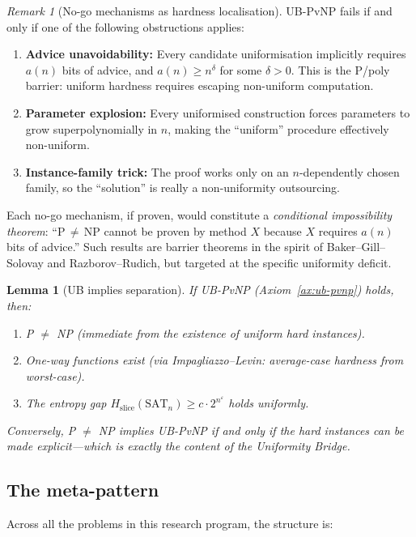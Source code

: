 \documentclass[aps,prd,twocolumn,superscriptaddress,nofootinbib]{revtex4-2}
\newtheorem{lemma}[theorem]{Lemma}
\theoremstyle{definition}
\theoremstyle{remark}
\newtheorem{remark}[theorem]{Remark}
\begin{document}
\begin{remark}[No-go mechanisms as hardness localisation]\label{rem:ub-nogo}
UB-PvNP fails if and only if one of the following obstructions applies:
\begin{enumerate}
\item \textbf{Advice unavoidability:} Every candidate uniformisation implicitly requires $a(n)$ bits of advice, and $a(n) \geq n^\delta$ for some $\delta > 0$. This is the P/poly barrier: uniform hardness requires escaping non-uniform computation.
\item \textbf{Parameter explosion:} Every uniformised construction forces parameters to grow superpolynomially in $n$, making the ``uniform'' procedure effectively non-uniform.
\item \textbf{Instance-family trick:} The proof works only on an $n$-dependently chosen family, so the ``solution'' is really a non-uniformity outsourcing.
\end{enumerate}
Each no-go mechanism, if proven, would constitute a \emph{conditional impossibility theorem}: ``P$\,\neq\,$NP cannot be proven by method $X$ because $X$ requires $a(n)$ bits of advice.'' Such results are barrier theorems in the spirit of Baker--Gill--Solovay and Razborov--Rudich, but targeted at the specific uniformity deficit.
\end{remark}

\begin{lemma}[UB implies separation]\label{lem:ub-separation}
If UB-PvNP (Axiom~\ref{ax:ub-pvnp}) holds, then:
\begin{enumerate}
\item[(a)] P $\neq$ NP (immediate from the existence of uniform hard instances).
\item[(b)] One-way functions exist (via Impagliazzo--Levin: average-case hardness from worst-case).
\item[(c)] The entropy gap $H_{\mathrm{slice}}(\mathrm{SAT}_n) \geq c \cdot 2^{n^\varepsilon}$ holds uniformly.
\end{enumerate}
Conversely, P $\neq$ NP implies UB-PvNP if and only if the hard instances can be made \emph{explicit}---which is exactly the content of the Uniformity Bridge.
\end{lemma}

\subsection{The meta-pattern}

Across all the problems in this research program, the structure is:
\end{document}
